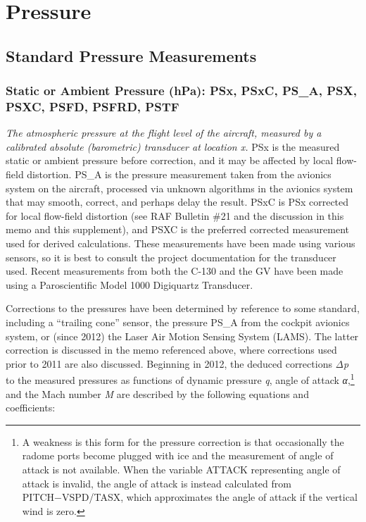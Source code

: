 \documentclass[
]{book}
\begin{document}
\hypertarget{pressure}{%
\section{Pressure}\label{pressure}}

\hypertarget{standard-pressure-measurements}{%
\subsection{Standard Pressure Measurements}\label{standard-pressure-measurements}}

\hypertarget{psx}{%
\subsubsection*{Static or Ambient Pressure (hPa): PSx, PSxC, PS\_A, PSX, PSXC, PSFD, PSFRD, PSTF}\label{psx}}

\emph{The atmospheric pressure at the flight level of the aircraft, measured by a calibrated absolute (barometric) transducer at location x.} PSx is the measured static or ambient pressure before correction, and it may be affected by local flow-field distortion. PS\_A is the pressure measurement taken from the avionics system on the aircraft, processed via unknown algorithms in the avionics system that may smooth, correct, and perhaps delay the result. PSxC is PSx corrected for local flow-field distortion (see RAF Bulletin \#21 and the discussion in this memo and this supplement), and PSXC is the preferred corrected measurement used for derived calculations. These measurements have been made using various sensors, so it is best to consult the project documentation for the transducer used. Recent measurements from both the C-130 and the GV have been made using a Paroscientific Model 1000 Digiquartz Transducer.

Corrections to the pressures have been determined by reference to some standard, including a ``trailing cone'' sensor, the pressure PS\_A from the cockpit avionics system, or (since 2012) the Laser Air Motion Sensing System (LAMS). The latter correction is discussed in the memo referenced above, where corrections used prior to 2011 are also discussed. Beginning in 2012, the deduced corrections {\emph{Δp}} to the measured pressures as functions of dynamic pressure {\emph{q},} angle of attack {\emph{α},}\footnote{A weakness is this form for the pressure correction is that occasionally the radome ports become plugged with ice and the measurement of angle of attack is not available. When the variable ATTACK representing angle of attack is invalid, the angle of attack is instead calculated from PITCH{−}VSPD/TASX, which approximates the angle of attack if the vertical wind is zero.}
and the Mach number {\emph{M}} are described by the following equations and coefficients:
\end{document}
